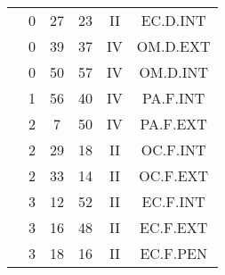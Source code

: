 \documentclass[12pt, a4paper]{article}
\begin{document}
\begin{multicols}{3}
{\begin{tabular}{c c c c c c}
	 	 	 	 & 0 & 27 & 23 & II & EC.D.INT\\%
	 	 	 	 & 0 & 39 & 37 & IV & OM.D.EXT\\%
	 	 	 	 & 0 & 50 & 57 & IV & OM.D.INT\\%
	 	 	 	 & 1 & 56 & 40 & IV & PA.F.INT\\%
	 	 	 	 & 2 & 7 & 50 & IV & PA.F.EXT\\%
	 	 	 	 & 2 & 29 & 18 & II & OC.F.INT\\%
	 	 	 	 & 2 & 33 & 14 & II & OC.F.EXT\\%
	 	 	 	 & 3 & 12 & 52 & II & EC.F.INT\\%
	 	 	 	 & 3 & 16 & 48 & II & EC.F.EXT\\%
	 	 	 	 & 3 & 18 & 16 & II & EC.F.PEN\\%
	 	 \end{tabular}
 	}
\end{multicols}
\end{document}
